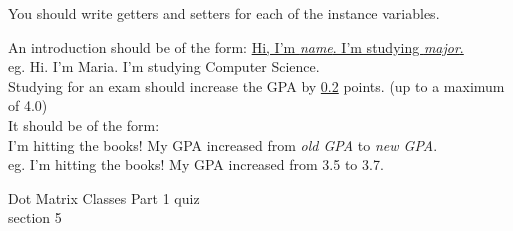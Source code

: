 \documentclass{article}
\newcommand{\tab}{\hspace*{0.25in}}
\begin{document}
\begin{enumerate}
	\vspace*{2ex}
	You should write getters and setters for each of the instance variables.\

	An introduction should be of the form: \underline{Hi, I'm  \textit{name}.  
	I'm studying \textit{major}.}\\
	\tab \tab eg. Hi. I'm Maria. I'm studying Computer Science.\\

	Studying for an exam should increase the GPA by \underline{0.2} points. (up to a maximum of 4.0)\\  
	It should be of the form: \\
	I'm hitting the books! My GPA increased from \textit{old GPA} to \textit{new GPA}.\\
	\tab \tab eg. I'm hitting the books! My GPA increased from 3.5 to 3.7.\\




\end{enumerate}
\pagebreak
Dot Matrix \hfill Classes Part 1 quiz\\
section 5\\
\end{document}
